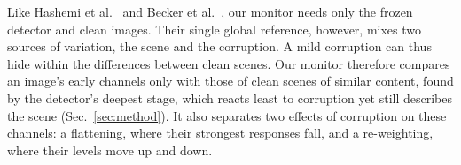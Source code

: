 Like Hashemi et al.~\cite{hashemi2023runtime} and Becker et al.~\cite{becker2026operational}, our monitor needs only the frozen detector and clean images. Their single global reference, however, mixes two sources of variation, the scene and the corruption. A mild corruption can thus hide within the differences between clean scenes. Our monitor therefore compares an image's early channels only with those of clean scenes of similar content, found by the detector's deepest stage, which reacts least to corruption yet still describes the scene (Sec.~\ref{sec:method}). It also separates two effects of corruption on these channels: a flattening, where their strongest responses fall, and a re-weighting, where their levels move up and down.
